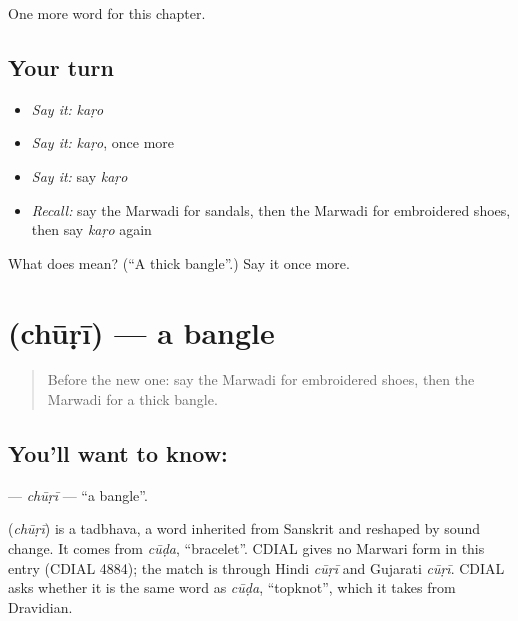 \begin{grammarlens}[title={What you've built}]
One more word for this chapter.
\end{grammarlens}

\subsection*{Your turn}
\begin{itemize}
\raggedright
  \item \emph{Say it:} \emph{kaṛo}
  \item \emph{Say it:} \emph{kaṛo}, once more
  \item \emph{Say it:} say \emph{kaṛo}
  \item \emph{Recall:} say the Marwadi for sandals, then the Marwadi for embroidered shoes, then say \emph{kaṛo} again
\end{itemize}

\begin{tcolorbox}[breakable,colback=teal!4,colframe=teal!35!black,title={Before you move on}]
What does  mean? (\textquotedblleft{}A thick bangle\textquotedblright{}.) Say it once more.
\end{tcolorbox}
\section[\texorpdfstring{\mw{चूड़ी} (chūṛī)}{चूड़ी (chūṛī)}]{ (chūṛī) — a bangle}

\label{lesson:MW-C129-churi}



\begin{quote}
Before the new one: say the Marwadi for embroidered shoes, then the Marwadi for a thick bangle.
\end{quote}

\subsection*{You'll want to know: }
\textbf{} — \emph{chūṛī} — \textquotedblleft{}a bangle\textquotedblright{}.

\begin{cousinweb}
\textbf{} (\emph{chūṛī}) is a tadbhava, a word inherited from Sanskrit and reshaped by sound change. It comes from \emph{cūḍa}, \textquotedblleft{}bracelet\textquotedblright{}. CDIAL gives no Marwari form in this entry (CDIAL 4884); the match is through Hindi \emph{cūṛī} and Gujarati \emph{cūṛī}. CDIAL asks whether it is the same word as \emph{cūḍa}, \textquotedblleft{}topknot\textquotedblright{}, which it takes from Dravidian.
\end{cousinweb}

